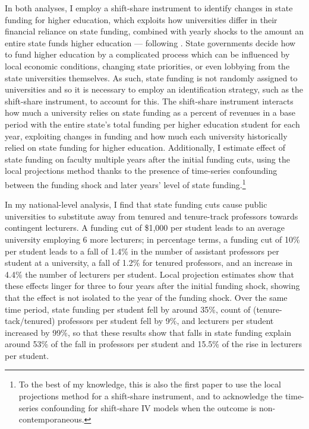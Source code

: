 In both analyses, I employ a shift-share instrument to identify changes in state funding for higher education, which exploits how universities differ in their financial reliance on state funding, combined with yearly shocks to the amount an entire state funds higher education --- following \cite{NBERw23736,NBERw27885}.
State governments decide how to fund higher education by a complicated process which can be influenced by local economic conditions, changing state priorities, or even lobbying from the state universities themselves.
As such, state funding is not randomly assigned to universities and so it is necessary to employ an identification strategy, such as the shift-share instrument, to account for this.
The shift-share instrument interacts how much a university relies on state funding as a percent of revenues in a base period with the entire state's total funding per higher education student for each year, exploiting changes in funding and how much each university historically relied on state funding for higher education.
Additionally, I estimate effect of state funding on faculty multiple years after the initial funding cuts, using the local projections method thanks to the presence of time-series confounding between the funding shock and later years' level of state funding.\footnote{
    To the best of my knowledge, this is also the first paper to use the local projections method for a shift-share instrument, and to acknowledge the time-series confounding for shift-share IV models when the outcome is non-contemporaneous.
}

In my national-level analysis, I find that state funding cuts cause public universities to substitute away from tenured and tenure-track professors towards contingent lecturers.
A funding cut of \$1,000 per student leads to an average university employing 6 more lecturers;
in percentage terms, a funding cut of 10\% per student leads to a fall of 1.4\% in the number of assistant professors per student at a university, a fall of 1.2\% for tenured professors, and an increase in 4.4\% the number of lecturers per student.
Local projection estimates show that these effects linger for three to four years after the initial funding shock, showing that the effect is not isolated to the year of the funding shock. 
Over the same time period, state funding per student fell by around 35\%, count of (tenure-tack/tenured) professors per student fell by 9\%, and lecturers per student increased by 99\%, so that these results show that falls in state funding explain around 53\% of the fall in professors per student
and 15.5\% of the rise in lecturers per student.


